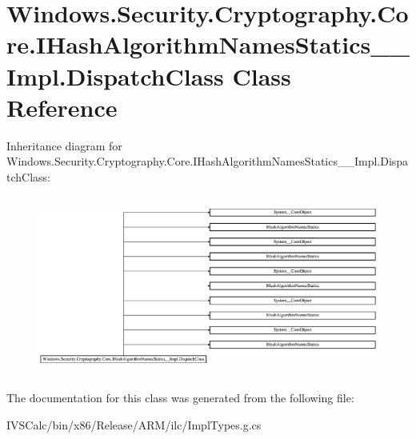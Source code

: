\hypertarget{class_windows_1_1_security_1_1_cryptography_1_1_core_1_1_i_hash_algorithm_names_statics_____impl_1_1_dispatch_class}{}\section{Windows.\+Security.\+Cryptography.\+Core.\+I\+Hash\+Algorithm\+Names\+Statics\+\_\+\+\_\+\+Impl.\+Dispatch\+Class Class Reference}
\label{class_windows_1_1_security_1_1_cryptography_1_1_core_1_1_i_hash_algorithm_names_statics_____impl_1_1_dispatch_class}
Inheritance diagram for Windows.\+Security.\+Cryptography.\+Core.\+I\+Hash\+Algorithm\+Names\+Statics\+\_\+\+\_\+\+Impl.\+Dispatch\+Class\+:\begin{figure}[H]
\begin{center}
\leavevmode
\includegraphics[height=5.934489cm]{class_windows_1_1_security_1_1_cryptography_1_1_core_1_1_i_hash_algorithm_names_statics_____impl_1_1_dispatch_class}
\end{center}
\end{figure}


The documentation for this class was generated from the following file\+:\begin{DoxyCompactItemize}
\item 
I\+V\+S\+Calc/bin/x86/\+Release/\+A\+R\+M/ilc/Impl\+Types.\+g.\+cs\end{DoxyCompactItemize}
